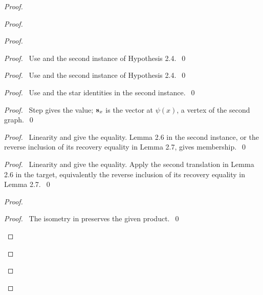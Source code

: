 \begin{proof}
 \begin{proof}
  \begin{proof}
   \begin{proof}\pf\ Use  and the second instance of Hypothesis 2.4.~\qed\end{proof}
   \begin{proof}\pf\ Use  and the second instance of Hypothesis 2.4.~\qed\end{proof}
   \begin{proof}\pf\ Use  and the star identities in the second instance.~\qed\end{proof}
   \begin{proof}\pf\ Step  gives the value; ${\mathbf s}_x$ is the
    vector at $\psi(x)$, a vertex of the second graph.~\qed\end{proof}
   \begin{proof}\pf\ Linearity and  give the equality.
    Lemma 2.6 in the second instance, or the reverse inclusion of its recovery
    equality in Lemma 2.7, gives membership.~\qed\end{proof}
   \begin{proof}\pf\ Linearity and  give the equality.
    Apply the second translation in Lemma 2.6 in the target, equivalently the
    reverse inclusion of its recovery equality in Lemma 2.7.~\qed\end{proof}
   \begin{proof}
    \begin{proof}\pf\ The isometry in  preserves the given product.~\qed\end{proof}

\end{proof}
\end{proof}
\end{proof}
\end{proof}
